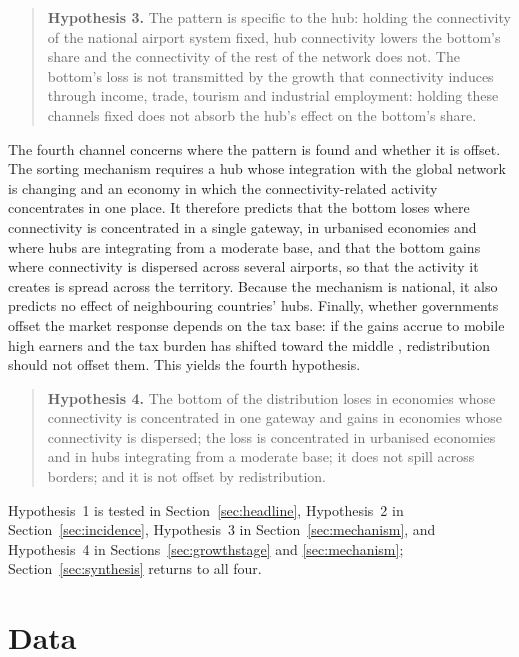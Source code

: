 \begin{quote}
\textbf{Hypothesis 3.} The pattern is specific to the hub: holding the connectivity of the national airport system fixed, hub connectivity lowers the bottom's share and the connectivity of the rest of the network does not. The bottom's loss is not transmitted by the growth that connectivity induces through income, trade, tourism and industrial employment: holding these channels fixed does not absorb the hub's effect on the bottom's share.
\end{quote}

The fourth channel concerns where the pattern is found and whether it is offset. The sorting mechanism requires a hub whose integration with the global network is changing and an economy in which the connectivity-related activity concentrates in one place. It therefore predicts that the bottom loses where connectivity is concentrated in a single gateway, in urbanised economies and where hubs are integrating from a moderate base, and that the bottom gains where connectivity is dispersed across several airports, so that the activity it creates is spread across the territory. Because the mechanism is national, it also predicts no effect of neighbouring countries' hubs. Finally, whether governments offset the market response depends on the tax base: if the gains accrue to mobile high earners and the tax burden has shifted toward the middle \citep{Egger_2019,Kleven_2013}, redistribution should not offset them. This yields the fourth hypothesis.

\begin{quote}
\textbf{Hypothesis 4.} The bottom of the distribution loses in economies whose connectivity is concentrated in one gateway and gains in economies whose connectivity is dispersed; the loss is concentrated in urbanised economies and in hubs integrating from a moderate base; it does not spill across borders; and it is not offset by redistribution.
\end{quote}

Hypothesis~1 is tested in Section~\ref{sec:headline}, Hypothesis~2 in Section~\ref{sec:incidence}, Hypothesis~3 in Section~\ref{sec:mechanism}, and Hypothesis~4 in Sections~\ref{sec:growthstage} and \ref{sec:mechanism}; Section~\ref{sec:synthesis} returns to all four.

\section{Data}
\label{sec:data}
